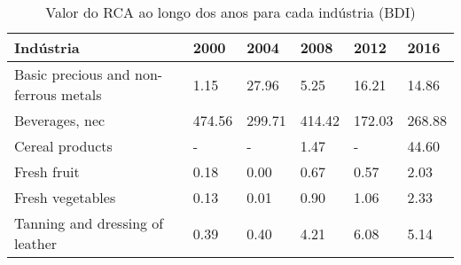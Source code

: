 \begin{table}
\centering
\caption{Valor do RCA ao longo dos anos para cada indústria (BDI)}
\label{tab:ex3-tempo-BDI}
\begin{tabular}{p{6cm}p{1.5cm}p{1.5cm}p{1.5cm}p{1.5cm}p{1.5cm}}
\toprule
                            Indústria &   2000 &   2004 &   2008 &   2012 &   2016 \\
\midrule
Basic precious and non-ferrous metals &   1.15 &  27.96 &   5.25 &  16.21 &  14.86 \\
                       Beverages, nec & 474.56 & 299.71 & 414.42 & 172.03 & 268.88 \\
                      Cereal products &      - &      - &   1.47 &      - &  44.60 \\
                          Fresh fruit &   0.18 &   0.00 &   0.67 &   0.57 &   2.03 \\
                     Fresh vegetables &   0.13 &   0.01 &   0.90 &   1.06 &   2.33 \\
      Tanning and dressing of leather &   0.39 &   0.40 &   4.21 &   6.08 &   5.14 \\
\bottomrule
\end{tabular}
\end{table}
